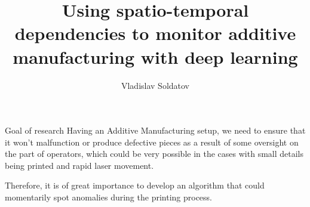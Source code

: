 \documentclass{beamer}
\title{Using spatio-temporal dependencies to monitor additive manufacturing with deep learning}
\author[V.\,D.~Soldatov]{Vladislav Soldatov}
\institute{Moscow State University}
\date{\footnotesize
\par\smallskip\emph{Course:} My first scientific paper
\par\smallskip\emph{Expert:} Kropotov D.A.
\par\smallskip\emph{Consultant:} Sinilshchikov I.V.
\par\bigskip\small 2023}
\begin{document}
\begin{frame}
\thispagestyle{empty}
\maketitle
\end{frame}
\begin{frame}{Goal of research}
    Having an Additive Manufacturing setup, we need to ensure that it won't malfunction or produce defective pieces as a result of some oversight on the part of operators, which could be very possible in the cases with small details being printed and rapid laser movement.
    
    Therefore, it is of great importance to develop an algorithm that could momentarily spot anomalies during the printing process.
\end{frame}




    


\end{document}
